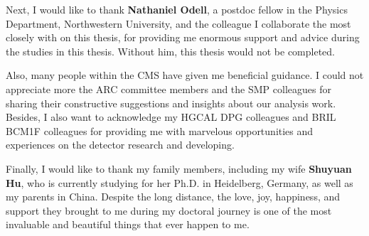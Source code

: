 \documentclass[12pt,reqno]{nuthesis}
\begin{document}
    Next, I would like to thank \textbf{Nathaniel Odell}, a postdoc fellow in the Physics Department, Northwestern University, and the colleague I collaborate the most closely with on this thesis, for providing me enormous support and advice during the studies in this thesis. Without him, this thesis would not be completed. 

    Also, many people within the CMS have given me beneficial guidance. I could not appreciate more the ARC committee members and the SMP colleagues for sharing their constructive suggestions and insights about our analysis work. Besides, I also want to acknowledge my HGCAL DPG colleagues and BRIL BCM1F colleagues for providing me with marvelous opportunities and experiences on the detector research and developing.

    Finally, I would like to thank my family members, including my wife \textbf{Shuyuan Hu}, who is currently studying for her Ph.D. in Heidelberg, Germany, as well as my parents in China. Despite the long distance, the love, joy, happiness, and support they brought to me during my doctoral journey is one of the most invaluable and beautiful things that ever happen to me.



    \clearpage{} 
    \setcounter{tocdepth}{2}
    \begin{spacing}{1.5}
        \tableofcontents	
    \end{spacing}

    \clearpage{} 
    \listoftables
    \clearpage{} 
    \listoffigures



    \mainmatter
    
    
    
    
    
    
    
    
    \begin{appendix}
    \end{appendix}
    
\end{document}
